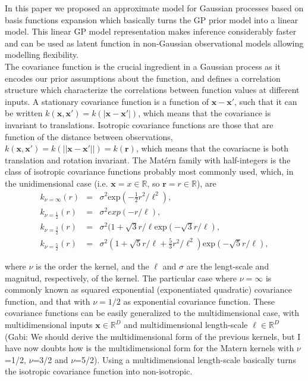 \documentclass[]{interact}
\theoremstyle{plain}%
\theoremstyle{definition}
\theoremstyle{remark}
\begin{document}
In this paper we proposed an approximate model for Gaussian processes based on basis functions expansion which basically turns the GP prior model into a linear model. This linear GP model representation makes inference considerably faster and can be used as latent function in non-Gaussian observational models allowing modelling flexibility.\\

The covariance function is the crucial ingredient in a Gaussian process as it encodes our prior assumptions about the function, and defines a correlation structure which characterize the correlations between function values at different inputs. A stationary covariance function is a function of $\mathbf{x}-\mathbf{x}'$, such that it can be written $k(\mathbf{x},\mathbf{x}') = k(|\mathbf{x}-\mathbf{x}'|)$, which means that the covariance is invariant to translations. Isotropic covariance functions are those that are function of the distance between observations, $k(\mathbf{x},\mathbf{x}') = k(||\mathbf{x}-\mathbf{x}'||) = k(\mathbf{r})$, which means that the covariacne is both translation and rotation invariant. The Mat\'ern family with half-integers is the class of isotropic covariance functions probably most commonly used, which, in the unidimensional case (i.e. $\mathbf{x}=x\in \mathbb{R}$, so $\mathbf{r}=r\in \mathbb{R}$), are
%
\begin{eqnarray}
k_{\nu=\infty}(r)&=&\sigma^2 \text{exp}(-\frac{1}{2} r^2/\ell^2), \nonumber \\
k_{\nu=\frac{1}{2}}(r)&=&\sigma^2 exp(-r/\ell), \nonumber \\
k_{\nu=\frac{3}{2}}(r)&=&\sigma^2(1+\sqrt{3}r/\ell \text{exp}(-\sqrt{3}r/\ell), \nonumber \\
k_{\nu=\frac{5}{2}}(r)&=&\sigma^2(1+\sqrt{5}r/\ell+\frac{5}{3}r^2/\ell^2) \text{exp}(-\sqrt{5}r/\ell), \nonumber 
\end{eqnarray}

\noindent where $\nu$ is the order the kernel, and the $\ell$ and $\sigma$ are the lengt-scale and magnitud, respectively, of the kernel. The particular case where $\nu=\infty$ is commonly known as squared exponential (exponentiated quadratic) covariance function, and that with $\nu=1/2$ as exponential covariance function. These covariance functions can be easily generalized to the multidimensional case, with multidimensional inputs $\mathbf{x}\in \mathbb{R}^D$ and multidimensional length-scale $\boldsymbol{\ell}\in \mathbb{R}^D$ (Gabi: We should derive the multidimensional form of the previous kernels, but I have now doubts how is the multidimensional form for the Matern kernels with $\nu$=1/2, $\nu$=3/2 and $\nu$=5/2). Using a multidimensional length-scale basically turns the isotropic covariance function into non-isotropic. 
\end{document}
